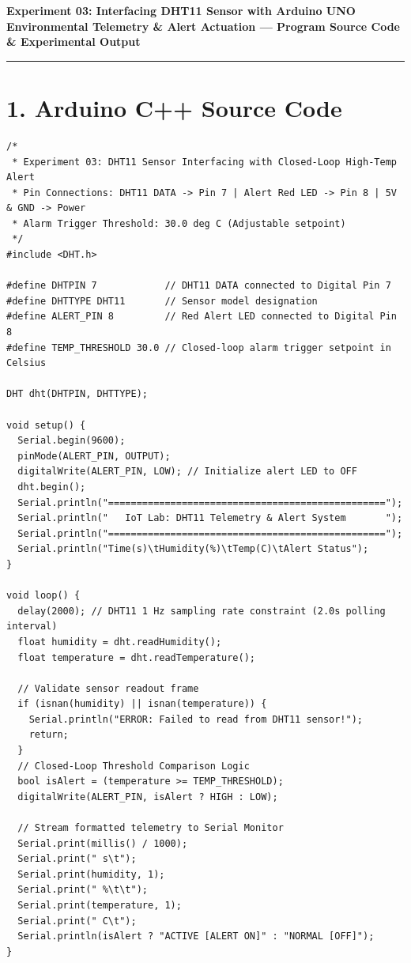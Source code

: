 \documentclass[10pt,a4paper]{article}
\begin{document}
\newpage

\begin{center}
    {\large\bfseries Experiment 03: Interfacing DHT11 Sensor with Arduino UNO}\\[0.06cm]
    {\normalsize\textbf{Environmental Telemetry \& Alert Actuation --- Program Source Code \& Experimental Output}}
\end{center}
\vspace{-0.24cm}
\rule{\textwidth}{0.8pt}
\vspace{0.06cm}

\section*{1. Arduino C++ Source Code}
\begin{lstlisting}[style=bwCode, title={\textbf{Listing 3.1: Microcontroller Firmware for DHT11 Telemetry and Closed-Loop Alert Actuation.}}]
/*
 * Experiment 03: DHT11 Sensor Interfacing with Closed-Loop High-Temp Alert
 * Pin Connections: DHT11 DATA -> Pin 7 | Alert Red LED -> Pin 8 | 5V & GND -> Power
 * Alarm Trigger Threshold: 30.0 deg C (Adjustable setpoint)
 */
#include <DHT.h>

#define DHTPIN 7            // DHT11 DATA connected to Digital Pin 7
#define DHTTYPE DHT11       // Sensor model designation
#define ALERT_PIN 8         // Red Alert LED connected to Digital Pin 8
#define TEMP_THRESHOLD 30.0 // Closed-loop alarm trigger setpoint in Celsius

DHT dht(DHTPIN, DHTTYPE);

void setup() {
  Serial.begin(9600);
  pinMode(ALERT_PIN, OUTPUT);
  digitalWrite(ALERT_PIN, LOW); // Initialize alert LED to OFF
  dht.begin();
  Serial.println("=================================================");
  Serial.println("   IoT Lab: DHT11 Telemetry & Alert System       ");
  Serial.println("=================================================");
  Serial.println("Time(s)\tHumidity(%)\tTemp(C)\tAlert Status");
}

void loop() {
  delay(2000); // DHT11 1 Hz sampling rate constraint (2.0s polling interval)
  float humidity = dht.readHumidity();
  float temperature = dht.readTemperature();

  // Validate sensor readout frame
  if (isnan(humidity) || isnan(temperature)) {
    Serial.println("ERROR: Failed to read from DHT11 sensor!");
    return;
  }
  // Closed-Loop Threshold Comparison Logic
  bool isAlert = (temperature >= TEMP_THRESHOLD);
  digitalWrite(ALERT_PIN, isAlert ? HIGH : LOW);

  // Stream formatted telemetry to Serial Monitor
  Serial.print(millis() / 1000);
  Serial.print(" s\t");
  Serial.print(humidity, 1);
  Serial.print(" %\t\t");
  Serial.print(temperature, 1);
  Serial.print(" C\t");
  Serial.println(isAlert ? "ACTIVE [ALERT ON]" : "NORMAL [OFF]");
}
\end{lstlisting}
\end{document}
